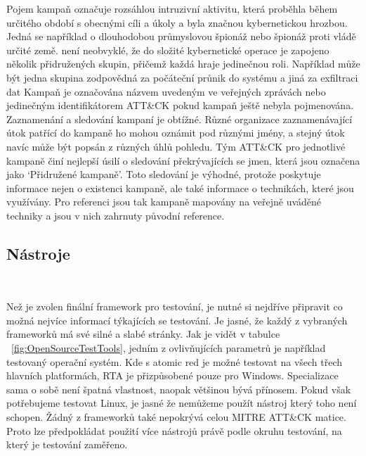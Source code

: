 Pojem kampaň označuje rozsáhlou intruzivní aktivitu, která proběhla během určitého období s obecnými cíli a úkoly a byla značnou kybernetickou hrozbou.
Jedná se například o dlouhodobou průmyslovou špionáž nebo špionáž proti vládě určité země.
není neobvyklé, že do složité kybernetické operace je zapojeno několik přidružených skupin, přičemž každá hraje jedinečnou roli.
Například může být jedna skupina zodpovědná za počáteční průnik do systému a jiná za exfiltraci dat
Kampaň je označována názvem uvedeným ve veřejných zprávách nebo jedinečným identifikátorem ATT\&CK pokud kampaň ještě nebyla pojmenována.
Zaznamenání a sledování kampaní je obtížné.
Různé organizace zaznamenávající útok patřící do kampaně ho mohou oznámit pod různými jmény, a stejný útok navíc může být popsán z různých úhlů pohledu.
Tým ATT\&CK pro jednotlivé kampaně činí nejlepší úsilí o sledování překrývajících se jmen, která jsou označena jako `Přidružené kampaně'.
Toto sledování je výhodné, protože poskytuje informace nejen o existenci kampaně, ale také informace o technikách, které jsou využívány.
Pro referenci jsou tak kampaně mapovány na veřejně uváděné techniky a jsou v nich zahrnuty původní reference.\cite{Mitre_campaigns}

\subsection{Nástroje}
~

Než je zvolen finální framework pro testování, je nutné si nejdříve připravit co možná nejvíce informací týkajících se testování.
Je jasné, že každý z vybraných frameworků má své silné a slabé stránky.
Jak je vidět v tabulce ~\ref{fig:OpenSourceTestTools}, jedním z ovlivňujících parametrů je například testovaný operační systém.
Kde s atomic red je možné testovat na všech třech hlavních platformách, \ac{RTA} je přizpůsobené pouze pro Windows.
Specializace sama o sobě není špatná vlastnost, naopak většinou bývá přínosem.
Pokud však potřebujeme testovat Linux, je jasné že nemůžeme použít nástroj který toho není schopen.
Žádný z frameworků také nepokrývá celou MITRE ATT\&CK matice.
Proto lze předpokládat použití více nástrojů právě podle okruhu testování, na který je testování zaměřeno.

